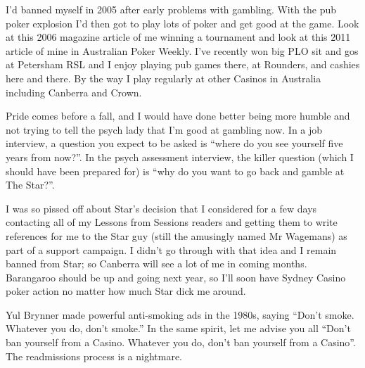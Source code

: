 I'd banned myself in 2005 after early problems with gambling.
With the pub poker explosion I'd then got to play lots of poker and
get good at the game. Look at this 2006 magazine article of me winning
a tournament and look at this 2011 article of mine in Australian Poker
Weekly. I've recently won big PLO sit and gos at Petersham RSL and I
enjoy playing pub games there, at Rounders, and cashies here and
there. By the way I play regularly at other Casinos in Australia
including Canberra and Crown.

Pride comes before a fall, and I would have done better being more
humble and not trying to tell the psych lady that I'm good at gambling
now. In a job interview, a question you expect to be asked is ``where
do you see yourself five years from now?''. In the psych assessment
interview, the killer question (which I should have been prepared for)
is ``why do you want to go back and gamble at The Star?''.

I was so pissed off about Star's decision that I considered for a few
days contacting all of my Lessons from Sessions readers and getting
them to write references for me to the Star guy (still the amusingly
named Mr Wagemans) as part of a support campaign. I didn't go through
with that idea and I remain banned from Star; so Canberra will see a
lot of me in coming months. Barangaroo should be up and going next
year, so I'll soon have Sydney Casino poker action no matter how much
Star dick me around.

Yul Brynner made powerful anti-smoking ads in the 1980s, saying
``Don't smoke. Whatever you do, don't smoke.'' In the same spirit, let
me advise you all ``Don't ban yourself from a Casino. Whatever you
do, don't ban yourself from a Casino''. The readmissions process is a
nightmare.







